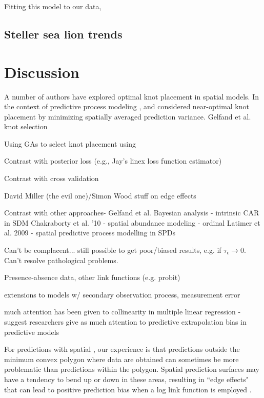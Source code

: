 \documentclass[12pt,english]{article}
\begin{document}
\begin{spacing}{1.9}
Fitting this model to our data,





\subsection{Steller sea lion trends}




\section{Discussion}

A number of authors have explored optimal knot placement in spatial models.  In the context of predictive process modeling \citep[where a covariance function is specified over a group of knots; see][]{BanerjeeEtAl2008}, \citet{FinleyEtAl2009} and \citet{GelfandEtAl2013} considered near-optimal knot placement by minimizing spatially averaged prediction variance.
Gelfand et al. knot selection

Using GAs to select knot placement using


Contrast with posterior loss (e.g., Jay's linex loss function estimator)

Contrast with cross validation

David Miller (the evil one)/Simon Wood stuff on edge effects

Contrast with other approaches-
Gelfand et al. Bayesian analysis - intrinsic CAR in SDM
Chakraborty et al. '10 - spatial abundance modeling - ordinal
Latimer et al. 2009 - spatial predictive process modelling in SPDs

Can't be complacent... still possible to get poor/biased results, e.g. if $\tau_\epsilon \rightarrow 0$.  Can't resolve pathological problems.

Presence-absence data, other link functions (e.g. probit)

extensions to models w/ secondary observation process, measurement error

much attention has been given to collinearity in multiple linear regression - suggest researchers give as much attention to predictive extrapolation bias in predictive models

For predictions with spatial , our experience is that predictions outside the minimum convex polygon where data are obtained can sometimes be more problematic than predictions within the polygon.  Spatial prediction surfaces may have a tendency to bend up or down in these areas, resulting in ``edge effects" that can lead to positive prediction bias when a log link function is employed \citep{VerHoefJansen2007}.


\end{spacing}
\end{document}
